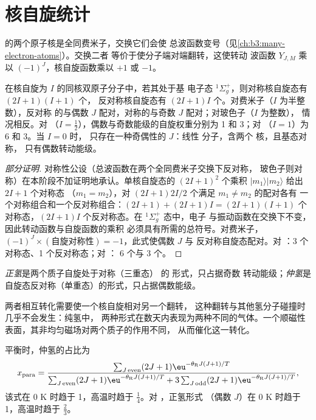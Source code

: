 \section{核自旋统计}

 的两个原子核是全同费米子，交换它们会使
总波函数变号（见\cref{ch:b3:many-electron-atoms}）。交换二者
等价于使分子端对端翻转，这使转动
波函数 $Y_{J,M}$ 乘以 $(-1)^J$，核自旋函数乘以 $+1$ 或 $-1$。

\begin{theorem}[核自旋统计]\label{thm:b3:statistical-thermo-applied:spin-statistics}
在核自旋为 $I$ 的同核双原子分子中，若其处于基
电子态 ${}^1\Sigma_g^+$，则对称核自旋态有 $(2I+1)(I+1)$ 个，
反对称核自旋态有 $(2I+1)I$ 个。对费米子（$I$ 为半整数），反对称
的与偶数 $J$ 配对，对称的与奇数 $J$ 配对；对玻色子（$I$ 为整数），
情况相反。对 （$I = \frac12$），偶数与奇数能级的自旋权重分别为
1 和 3；对 （$I = 1$）为 6 和 3。当 $I = 0$ 时，
只存在一种奇偶性的 $J$：线性  分子，含两个  核，且基态对称，
只有偶数转动能级。
\end{theorem}

\begin{proof}[部分证明]
对称性公设（总波函数在两个全同费米子交换下反对称，
玻色子则对称）在本阶段不加证明地承认。单核自旋态的
$(2I+1)^2$ 个乘积 $|m_1\rangle|m_2\rangle$ 给出 $2I+1$ 个对称态
（$m_1 = m_2$），对 $(2I+1)2I/2$ 个满足 $m_1 \ne m_2$ 的配对各有
一个对称组合和一个反对称组合：$(2I+1) + (2I+1)I = (2I+1)(I+1)$
个对称态，$(2I+1)I$ 个反对称态。在 ${}^1\Sigma_g^+$ 态中，电子
与振动函数在交换下不变，因此转动函数与自旋函数的乘积
必须具有所需的总符号。对费米子，
$(-1)^J \times(\text{自旋对称性}) = -1$，此式使偶数 $J$ 与
反对称自旋态配对。对 ：3 个对称态、1 个反对称态；对 ：
6 个与 3 个。
\end{proof}

\begin{definition}[正氢与仲氢]\label{def:b3:statistical-thermo-applied:spin-isomers}
\emph{正氢}是两个质子自旋处于对称（三重态）
的  形式，只占据奇数
转动能级；\emph{仲氢}是
自旋态反对称（单重态）的形式，只占据偶数能级。
\end{definition}

两者相互转化需要使一个核自旋相对另一个翻转，
这种翻转与其他氢分子碰撞时几乎不会发生：纯氢中，
两种形式在数天内表现为两种不同的气体。一个顺磁性
表面，其非均匀磁场对两个质子的作用不同，
从而催化这一转化。

\begin{proposition}[平衡正仲氢比]\label{prop:b3:statistical-thermo-applied:ortho-para}
平衡时，仲氢的占比为
\[
  x_{\mathrm{para}} = \frac{\sum_{J\,\mathrm{even}}(2J+1)\eu^{-\theta_{\mathrm R}J(J+1)/T}}
    {\sum_{J\,\mathrm{even}}(2J+1)\eu^{-\theta_{\mathrm R}J(J+1)/T} + 3\sum_{J\,\mathrm{odd}}(2J+1)\eu^{-\theta_{\mathrm R}J(J+1)/T}},
\]
该式在 0 K 时趋于 1，高温时趋于 $\frac14$。对 ，正氢形式
（偶数 $J$）在 0 K 时趋于 1，高温时趋于 $\frac23$。
\end{proposition}

